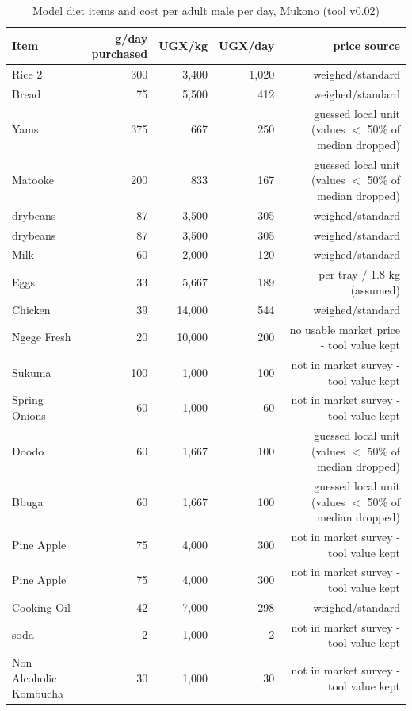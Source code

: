 \begin{table}[htbp]
\centering
\caption{Model diet items and cost per adult male per day, Mukono (tool v0.02)}
\label{tab:model_diet_items_mukono}
\begin{tabular}{lrrrr}
\toprule
Item & g/day purchased & UGX/kg & UGX/day & price source \\
\midrule
Rice 2 & 300 & 3,400 & 1,020 & weighed/standard \\
Bread & 75 & 5,500 & 412 & weighed/standard \\
Yams & 375 & 667 & 250 & guessed local unit (values $<$ 50\% of median dropped) \\
Matooke & 200 & 833 & 167 & guessed local unit (values $<$ 50\% of median dropped) \\
drybeans & 87 & 3,500 & 305 & weighed/standard \\
drybeans & 87 & 3,500 & 305 & weighed/standard \\
Milk & 60 & 2,000 & 120 & weighed/standard \\
Eggs & 33 & 5,667 & 189 & per tray / 1.8 kg (assumed) \\
Chicken & 39 & 14,000 & 544 & weighed/standard \\
Ngege Fresh & 20 & 10,000 & 200 & no usable market price - tool value kept \\
Sukuma & 100 & 1,000 & 100 & not in market survey - tool value kept \\
Spring Onions & 60 & 1,000 & 60 & not in market survey - tool value kept \\
Doodo & 60 & 1,667 & 100 & guessed local unit (values $<$ 50\% of median dropped) \\
Bbuga & 60 & 1,667 & 100 & guessed local unit (values $<$ 50\% of median dropped) \\
Pine Apple & 75 & 4,000 & 300 & not in market survey - tool value kept \\
Pine Apple & 75 & 4,000 & 300 & not in market survey - tool value kept \\
Cooking Oil & 42 & 7,000 & 298 & weighed/standard \\
soda & 2 & 1,000 & 2 & not in market survey - tool value kept \\
Non Alcoholic Kombucha & 30 & 1,000 & 30 & not in market survey - tool value kept \\
\bottomrule
\end{tabular}
\end{table}
